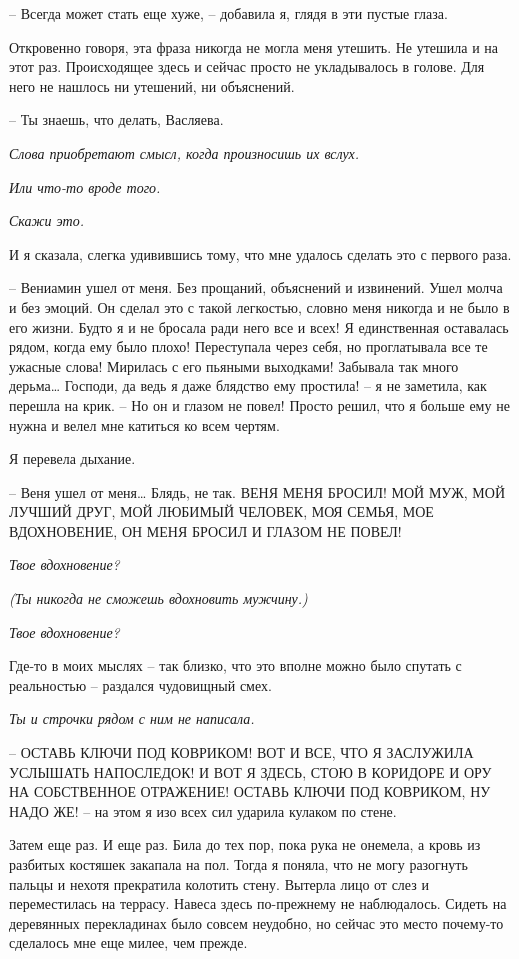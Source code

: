 \documentclass[
]{book}
\begin{document}
-- Всегда может стать еще хуже, -- добавила я, глядя в эти пустые глаза.

Откровенно говоря, эта фраза никогда не могла меня утешить. Не утешила и на этот раз. Происходящее здесь и сейчас просто не укладывалось в голове. Для него не нашлось ни утешений, ни объяснений.

-- Ты знаешь, что делать, Васляева.

\emph{Слова приобретают смысл, когда произносишь их вслух.}

\emph{Или что-то вроде того.}

\emph{Скажи это.}

И я сказала, слегка удивившись тому, что мне удалось сделать это с первого раза.

-- Вениамин ушел от меня. Без прощаний, объяснений и извинений. Ушел молча и без эмоций. Он сделал это с такой легкостью, словно меня никогда и не было в его жизни. Будто я и не бросала ради него все и всех! Я единственная оставалась рядом, когда ему было плохо! Переступала через себя, но проглатывала все те ужасные слова! Мирилась с его пьяными выходками! Забывала так много дерьма\ldots{} Господи, да ведь я даже блядство ему простила! -- я не заметила, как перешла на крик. -- Но он и глазом не повел! Просто решил, что я больше ему не нужна и велел мне катиться ко всем чертям.

Я перевела дыхание.

-- Веня ушел от меня\ldots{} Блядь, не так. ВЕНЯ МЕНЯ БРОСИЛ! МОЙ МУЖ, МОЙ ЛУЧШИЙ ДРУГ, МОЙ ЛЮБИМЫЙ ЧЕЛОВЕК, МОЯ СЕМЬЯ, МОЕ ВДОХНОВЕНИЕ, ОН МЕНЯ БРОСИЛ И ГЛАЗОМ НЕ ПОВЕЛ!

\emph{Твое вдохновение?}

\emph{(Ты никогда не сможешь вдохновить мужчину.)}

\emph{Твое вдохновение? }

Где-то в моих мыслях -- так близко, что это вполне можно было спутать с реальностью -- раздался чудовищный смех.

\emph{Ты и строчки рядом с ним не написала.}

-- ОСТАВЬ КЛЮЧИ ПОД КОВРИКОМ! ВОТ И ВСЕ, ЧТО Я ЗАСЛУЖИЛА УСЛЫШАТЬ НАПОСЛЕДОК! И ВОТ Я ЗДЕСЬ, СТОЮ В КОРИДОРЕ И ОРУ НА СОБСТВЕННОЕ ОТРАЖЕНИЕ! ОСТАВЬ КЛЮЧИ ПОД КОВРИКОМ, НУ НАДО ЖЕ! -- на этом я изо всех сил ударила кулаком по стене.

Затем еще раз. И еще раз. Била до тех пор, пока рука не онемела, а кровь из разбитых костяшек закапала на пол. Тогда я поняла, что не могу разогнуть пальцы и нехотя прекратила колотить стену. Вытерла лицо от слез и переместилась на террасу. Навеса здесь по-прежнему не наблюдалось. Сидеть на деревянных перекладинах было совсем неудобно, но сейчас это место почему-то сделалось мне еще милее, чем прежде.
\end{document}
